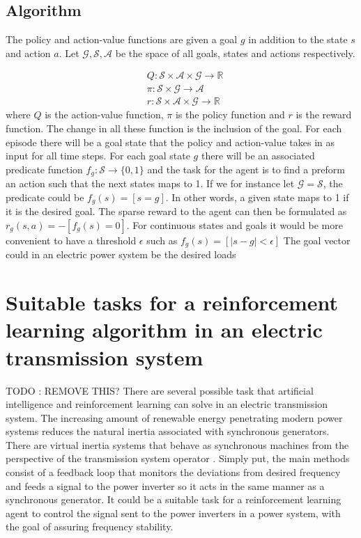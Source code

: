 \documentclass[class=book, crop=false]{standalone}
\begin{document}
\subsection{Algorithm}

The policy and action-value functions are given a goal $g$ in addition to the state $s$ and action $a$. Let $\mathcal{G}, \mathcal{S}, \mathcal{A}$ be the space of all goals, states and actions respectively. 

\begin{equation}
   \begin{aligned}
   \label{eq:theory:her_function_with_goal}
    &Q: \mathcal{S} \times \mathcal{A} \times \mathcal{G} \to \mathbb{R}
    \\
    &\pi: \mathcal{S} \times \mathcal{G} \to \mathcal{A}
    \\
    &r: \mathcal{S} \times \mathcal{A} \times \mathcal{G} \to \mathbb{R}
    \end{aligned} 
\end{equation}
where $Q$ is the action-value function, $\pi$ is the policy function and $r$ is the reward function. The change in all these function is the inclusion of the goal. For each episode there will be a goal state that the policy and action-value takes in as input for all time steps. For each goal state $g$ there will be an associated predicate function $f_{g}: \mathcal{S} \to \{0,1\}$ and the task for the agent is to find a preform an action such that the next states maps to 1. If we for instance let $\mathcal{G} = \mathcal{S}$, the predicate could be $f_{g}(s) = [s=g]$. In other words, a given state maps to 1 if it is the desired goal. The sparse reward to the agent can then be formulated as $r_{g}(s,a) = -[f_{g}(s)=0]$. For continuous states and goals it would be more convenient to have a threshold $\epsilon$ such as $f_{g}(s) = [|s-g| < \epsilon]$ The goal vector could in an electric power system be the desired loads


\section{Suitable tasks for a reinforcement learning algorithm in an electric transmission system}
TODO : REMOVE THIS?
There are several possible task that artificial intelligence and reinforcement learning can solve in an electric transmission system. The increasing amount of renewable energy penetrating modern power systems reduces the natural inertia associated with synchronous generators. There are virtual inertia systems that behave as synchronous machines from the perspective of the transmission system operator \cite{virtual_inertia}. Simply put, the main methods consist of a feedback loop that monitors the deviations from desired frequency and feeds a signal to the power inverter so it acts in the same manner as a synchronous generator. It could be a suitable task for a reinforcement learning agent to control the signal sent to the power inverters in a power system, with the goal of assuring frequency stability.
\end{document}
